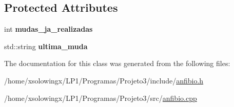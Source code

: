 \subsection*{Protected Attributes}
\begin{DoxyCompactItemize}
\item 
\mbox{\label{classAnfibio_a5d87808f8ed0adbf601c582c7e8093d1}} 
int {\bfseries mudas\+\_\+ja\+\_\+realizadas}
\item 
\mbox{\label{classAnfibio_ae859b67a63a815463e07f776d43de4ff}} 
std\+::string {\bfseries ultima\+\_\+muda}
\end{DoxyCompactItemize}


The documentation for this class was generated from the following files\+:\begin{DoxyCompactItemize}
\item 
/home/xsolowingx/\+L\+P1/\+Programas/\+Projeto3/include/\hyperlink{anfibio_8h}{anfibio.\+h}\item 
/home/xsolowingx/\+L\+P1/\+Programas/\+Projeto3/src/\hyperlink{anfibio_8cpp}{anfibio.\+cpp}\end{DoxyCompactItemize}
